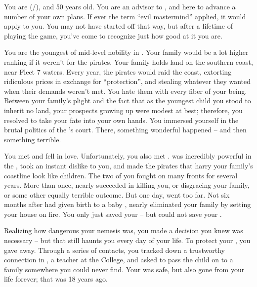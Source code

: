 \documentclass[char]{GL2020}
\begin{document}
\name{\cEvil{}}

You are \cEvil{\full} (\cEvil{\they}/\cEvil{\them}), and 50 years old. You are an advisor to \cQueen{\full}, and here to advance a number of your own plans. If ever the term ``evil mastermind'' applied, it would apply to you. You may not have started off that way, but after a lifetime of playing the game, you've come to recognize just how good at it you are.

You are the youngest \cEvil{\child} of mid-level nobility in \pFarm{}. Your family would be a lot higher ranking if it weren't for the pirates. Your family holds land on the southern coast, near Fleet 7 waters. Every year, the pirates would raid the coast, extorting ridiculous prices in exchange for ``protection'', and stealing whatever they wanted when their demands weren't met. You hate them with every fiber of your being. Between your family's plight and the fact that as the youngest child you stood to inherit no land, your prospects growing up were modest at best; therefore, you resolved to take your fate into your own hands. You immersed yourself in the brutal politics of the \cQueen{\Majesty}'s court. There, something wonderful happened -- and then something terrible.

You met \cPirateChildParent{} and fell in love. Unfortunately, you also met \cEvilNemesis{}. \cEvilNemesis{} was incredibly powerful in the \pFarm{}, took an instant dislike to you, and made the pirates that harry your family's coastline look like children. The two of you fought on many fronts for several years. More than once, \cEvilNemesis{\they} nearly succeeded in killing you, or disgracing your family, or some other equally terrible outcome. But one day, \cEvilNemesis{\they} went too far. Not six months after \cPirateChildParent{} had given birth to a baby \cPirateChild{\kid}, \cEvilNemesis{} nearly eliminated your family by setting your house on fire. You only just saved your \cPirateChild{\child} -- but could not save your \cPirateChildParent{\spouse}.

Realizing how dangerous your nemesis was, you made a decision you knew was necessary -- but that still haunts you every day of your life. To protect your \cPirateChild{\child}, you gave \cPirateChild{\them} away. Through a series of contacts, you tracked down a trustworthy connection in \cEthics{\full}, a teacher at the College, and asked \cEthics{\them} to pass the child on to a family somewhere you could never find. Your \cPirateChild{\child} was safe, but \cPirateChild{\they} \cPirateChild{\were} also gone from your life forever; that was 18 years ago. 
\end{document}
